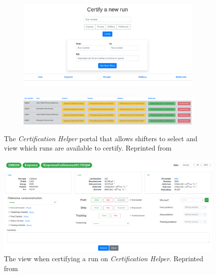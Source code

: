 \begin{figure}
	\centering

	\begin{subfigure}{.7\linewidth}
		\includegraphics*[width=\linewidth,trim= 4in 1.5in 4in 0]{Images/certhelper-portal.png}
	\end{subfigure}

	\begin{subfigure}{\linewidth}
		\includegraphics[width=1\linewidth]{Images/certhelper-list.png}
	\end{subfigure}
	\caption[The \textit{Certficiation Helper} portal]{The \textit{Certification Helper} portal that allows shifters to select and view which runs are available to certify. Reprinted from \cite{CertHelper}}
	\label{fig:certhelper-portal}
\end{figure}
\begin{figure}
	\centering
	\includegraphics[width=1\linewidth]{Images/certhelp-cert.png}
	\caption[The view when certifying a run on \textit{Certification Helper}]{The view when certifying a run on \textit{Certification Helper}. Reprinted from \cite{CertHelper}}
	\label{fig:certhelper-cert}
\end{figure}


